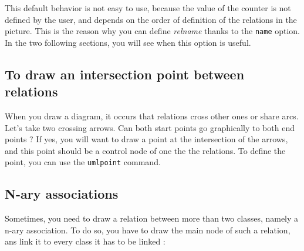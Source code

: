 \documentclass[a4paper,11pt]{report}
\newcommand{\inputTikZ}[1]{%
  }%
\newcommand{\inputTikZ}[1]{%
    \texttt{[image: fig/\#1.pdf]}%
  }%
\begin{document}
This default behavior is not easy to use, because the value of the counter is not defined by the user, and depends on the order of definition of the relations in the picture. This is the reason why you can define {\it relname} thanks to the {\tt name} option. In the two following sections, you will see when this option is useful.

\subsection{To draw an intersection point between relations}\label{ss.relpt}

When you draw a diagram, it occurs that relations cross other ones or share arcs. Let's take two crossing arrows.
Can both start points go graphically to both end points ? If yes, you will want to draw a point at the intersection of the arrows, and this point should be a control node of one the the relations. To define the point, you can use the {\tt umlpoint} command.

\medskip

\begin{minipage}{0.5\textwidth}

\end{minipage}
\begin{minipage}{0.4\textwidth}
\begin{center}
\inputTikZ{point}
\end{center}
\end{minipage}

\subsection{N-ary associations}

Sometimes, you need to draw a relation between more than two classes, namely a n-ary association. To do so, you have to draw the main node of such a relation, ans link it to every class it has to be linked :

\medskip

\begin{minipage}{0.5\textwidth}

\end{minipage}
\begin{minipage}{0.4\textwidth}
\begin{center}
\inputTikZ{naryassoc}
\end{center}
\end{minipage}

\medskip
\end{document}
